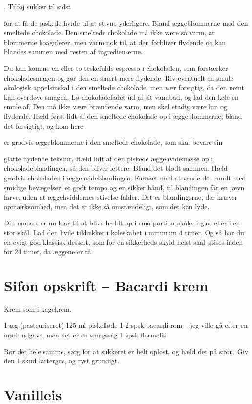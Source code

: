 \documentclass[
]{book}
\begin{document}
. Tilføj sukker til sidst

for at få de piskede hvide til at stivne yderligere.
Bland æggeblommerne med den smeltede chokolade. Den smeltede chokolade må ikke
være så varm, at blommerne koagulerer, men varm nok til, at den forbliver flydende og
kan blandes sammen med resten af ingredienserne.

Du kan komme en eller to teskefulde espresso i chokoladen, som forstærker
chokoladesmagen og gør den en snært mere flydende.
Riv eventuelt en smule økologisk appelsinskal i den smeltede chokolade, men vær
forsigtig, da den nemt kan overdøve smagen.
Lø
chokoladefadet ud af sit vandbad, og lad den køle en smule af. Den må ikke være
brændende varm, men skal stadig være lun og flydende.
Hæld først lidt af den smeltede chokolade op i æggeblommerne, bland det forsigtigt, og
kom here

er gradvis æggeblommerne i den smeltede chokolade, som skal bevare sin

glatte flydende tekstur.
Hæld lidt af den piskede æggehvidemasse op i chokoladeblandingen, så den bliver
lettere.
Bland det blødt sammen. Hæld gradvis chokoladen i æggehvideblandingen. Fortsæt
med at vende det rundt med smidige bevægelser, et godt tempo og en sikker hånd, til
blandingen får en jævn farve, uden at æggehviddernes stivelse falder. Det er
blandingerne, der kræver opmærksomhed, men det er ikke så omstændeligt, som det
kan lyde.

Din mousse er nu klar til at blive hældt op i små portionsskåle, i glas eller i en stor skål.
Lad den hvile tildækket i køleskabet i minimum 4 timer. Og så har du en evigt god
klassisk dessert, som for en sikkerheds skyld helst skal spises inden for 24 timer, da
æggene er rå.

\section{Sifon opskrift -- Bacardi krem}\label{sifon-opskrift-bacardi-krem}

Krem som i kagekrem.

1 æg (pasteuriseret)
125 ml piskefløde
1-2 spsk bacardi rom -- jeg ville gå efter en mørk udgave, men det er en smagssag
1 spsk flormelis

Rør det hele samme, sørg for at sukkeret er helt opløst, og hæld det på sifon. Giv den 1 skud lattergas, og ryst grundigt.

\section{Vanilleis}\label{vanilleis}
\end{document}
